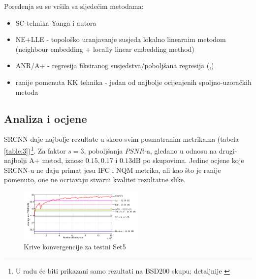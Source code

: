 \documentclass[12pt]{report}
\numberwithin{equation}{section}
\begin{document}
  Poređenja su se vršila sa sljedećim metodama: 

  
 \begin{itemize}
  
 \item SC-tehnika Yanga i autora \cite{sparse1}
 \item NE+LLE - topološko uranjavanje susjeda lokalno linearnim metodom (neighbour embedding + locally linear embedding method) \cite{nelle}
 \item ANR/A+ - regresija fiksiranog susjedstva/poboljšana regresija  (\cite{anr},\cite{aplus})
 \item ranije pomenuta KK tehnika - jedan od najbolje ocijenjenih spoljno-uzoračkih metoda \cite{kernel} 
  
\end{itemize}   

   \subsection{Analiza i ocjene}
   
 SRCNN daje najbolje rezultate u skoro svim posmatranim metrikama (tabela \ref{table:3})\footnote{U radu će biti prikazani samo rezultati na BSD200 skupu; detaljnije \cite{main}}. Za faktor $s=3$, poboljšanja $PSNR$-a, gledano u odnosu na drugi-najbolji A+ metod, iznose $0.15, 0.17$ i $0.13\text{dB}$ po skupovima. Jedine ocjene koje SRCNN-u ne daju primat jesu  IFC i NQM metrika, ali kao što je ranije pomenuto, one ne ocrtavaju stvarni kvalitet rezultatne slike. 
 
 
 \begin{figure}
\vspace{-20pt}  
  \begin{center}
    \includegraphics[width=0.55\textwidth]{SLIKE/figre10}
  \end{center}
  \vspace{-20pt}
  \caption{Krive konvergencije za testni Set5}
  \label{fig:test10}
  \vspace{-20pt}
\end{figure}
\end{document}
